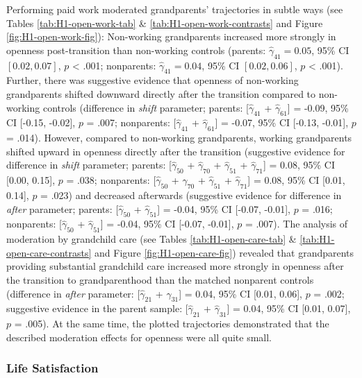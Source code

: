 \documentclass[
  english,
  man, noextraspace]{apa7}
\begin{document}
Performing paid work moderated grandparents' trajectories in subtle ways (see Tables \ref{tab:H1-open-work-tab} \& \ref{tab:H1-open-work-contrasts} and Figure \ref{fig:H1-open-work-fig}): Non-working grandparents increased more strongly in openness post-transition than non-working controls (parents: \(\hat{\gamma}_{41} = 0.05\), 95\% CI \([0.02, 0.07]\), \(p\) \textless{} .001; nonparents: \(\hat{\gamma}_{41} = 0.04\), 95\% CI \([0.02, 0.06]\), \(p\) \textless{} .001). Further, there was suggestive evidence that openness of non-working grandparents shifted downward directly after the transition compared to non-working controls (difference in \emph{shift} parameter; parents: {[}\(\hat{\gamma}_{41}\) + \(\hat{\gamma}_{61}\){]} = -0.09, 95\% CI {[}-0.15, -0.02{]}, \(p\) = .007; nonparents: {[}\(\hat{\gamma}_{41}\) + \(\hat{\gamma}_{61}\){]} = -0.07, 95\% CI {[}-0.13, -0.01{]}, \(p\) = .014). However, compared to non-working grandparents, working grandparents shifted upward in openness directly after the transition (suggestive evidence for difference in \emph{shift} parameter; parents: {[}\(\hat{\gamma}_{50}\) + \(\hat{\gamma}_{70}\) + \(\hat{\gamma}_{51}\) + \(\hat{\gamma}_{71}\){]} = 0.08, 95\% CI {[}0.00, 0.15{]}, \(p\) = .038; nonparents: {[}\(\hat{\gamma}_{50}\) + \(\hat{\gamma}_{70}\) + \(\hat{\gamma}_{51}\) + \(\hat{\gamma}_{71}\){]} = 0.08, 95\% CI {[}0.01, 0.14{]}, \(p\) = .023) and decreased afterwards (suggestive evidence for difference in \emph{after} parameter; parents: {[}\(\hat{\gamma}_{50}\) + \(\hat{\gamma}_{51}\){]} = -0.04, 95\% CI {[}-0.07, -0.01{]}, \(p\) = .016; nonparents: {[}\(\hat{\gamma}_{50}\) + \(\hat{\gamma}_{51}\){]} = -0.04, 95\% CI {[}-0.07, -0.01{]}, \(p\) = .007). The analysis of moderation by grandchild care (see Tables \ref{tab:H1-open-care-tab} \& \ref{tab:H1-open-care-contrasts} and Figure \ref{fig:H1-open-care-fig}) revealed that grandparents providing substantial grandchild care increased more strongly in openness after the transition to grandparenthood than the matched nonparent controls (difference in \emph{after} parameter: {[}\(\hat{\gamma}_{21}\) + \(\hat{\gamma}_{31}\){]} = 0.04, 95\% CI {[}0.01, 0.06{]}, \(p\) = .002; suggestive evidence in the parent sample: {[}\(\hat{\gamma}_{21}\) + \(\hat{\gamma}_{31}\){]} = 0.04, 95\% CI {[}0.01, 0.07{]}, \(p\) = .005). At the same time, the plotted trajectories demonstrated that the described moderation effects for openness were all quite small.

\hypertarget{life-satisfaction-1}{%
\subsubsection{Life Satisfaction}\label{life-satisfaction-1}}
\end{document}
